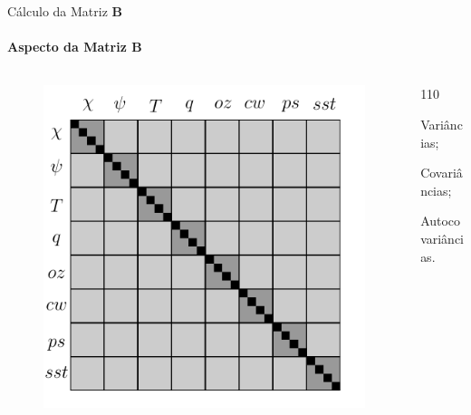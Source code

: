 \documentclass[10pt,aspectratio=169]{beamer}
\begin{document}
\begin{frame}[fragile]{Cálculo da Matriz $\mathbf{B}$}
\framesubtitle{Aspecto da Matriz $\mathbf{B}$}
  \vspace{-2em}
  \begin{columns}
    \begin{column}{0.5\textwidth}
        \begin{figure}[H]
          \centering
          \hspace*{2em}\includegraphics[scale=0.45]{figs/matriz_B-new.pdf}
          \vspace{-1.5em}
          \caption{}
        \end{figure}  
    \end{column}
    \begin{column}{0.5\textwidth} 
        \begin{dinglist}{110}
            \item Variâncias;
            \item Covariâncias;
            \item Autocovariâncias.
        \end{dinglist}

\end{column}
\end{columns}
\end{frame}
\end{document}
